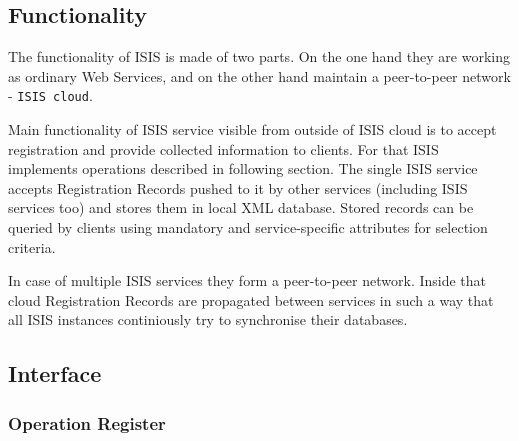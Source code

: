 \documentclass{book}
\begin{document}
\subsection{Functionality}
\label{sub:isis_functionality}

 The functionality of ISIS is made of two parts. On the one hand they are working as ordinary Web Services, and on the other hand maintain a peer-to-peer network - \texttt{ISIS cloud}.

 Main functionality of ISIS service visible from outside of ISIS cloud is to accept registration and provide collected information to clients. For that ISIS implements operations described in following section.
The single ISIS service accepts Registration Records pushed to it by other services (including ISIS services too) and stores them in local XML database. Stored records can be queried by clients using mandatory and service-specific attributes for selection criteria.

 In case of multiple ISIS services they form a peer-to-peer network. Inside that cloud Registration Records are propagated between services in such a way that all ISIS instances continiously try to synchronise their databases.



\subsection{Interface} 
\label{sub:isis_interface}

\subsubsection{Operation Register}
\end{document}
